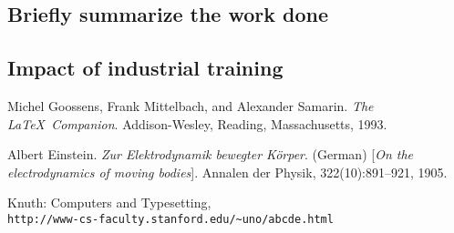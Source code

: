\documentclass[12pt]{article}
\begin{document}
\subsection{Briefly summarize the work done}
\lipsum[2-4]
\subsection{Impact of industrial training}
\lipsum[2-4]

\begin{thebibliography}{9}
	Michel Goossens, Frank Mittelbach, and Alexander Samarin. 
	\textit{The \LaTeX\ Companion}. 
	Addison-Wesley, Reading, Massachusetts, 1993.
	
	Albert Einstein. 
	\textit{Zur Elektrodynamik bewegter K{\"o}rper}. (German) 
	[\textit{On the electrodynamics of moving bodies}]. 
	Annalen der Physik, 322(10):891–921, 1905.
	
	Knuth: Computers and Typesetting,
	\\\texttt{http://www-cs-faculty.stanford.edu/\~{}uno/abcde.html}
\end{thebibliography}
\end{document}
